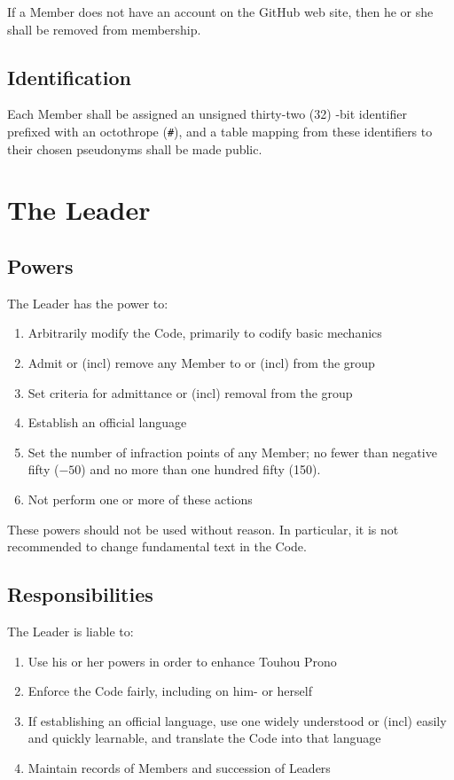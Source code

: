 \documentclass[10pt]{book}
\begin{document}
If a Member does not have an account on the GitHub web site, then he or she shall be removed from membership.

\subsection{Identification}

Each Member shall be assigned an unsigned thirty-two (32) -bit identifier prefixed with an octothrope (\texttt{\#}), and a table mapping from these identifiers to their chosen pseudonyms shall be made public.

\section{The Leader}
\label{sec:leader}

\subsection{Powers}

The Leader has the power to:

\begin{enumerate}
 \item Arbitrarily modify the Code, primarily to codify basic mechanics
 \item Admit or (incl) remove any Member to or (incl) from the group
 \item Set criteria for admittance or (incl) removal from the group
 \item Establish an official language
 \item Set the number of infraction points of any Member; no fewer than negative fifty ($-50$) and no more than one hundred fifty (150).
 \item Not perform one or more of these actions
\end{enumerate}

These powers should not be used without reason. In particular, it is not recommended to change fundamental text in the Code.

\subsection{Responsibilities}

The Leader is liable to:

\begin{enumerate}
 \item Use his or her powers in order to enhance Touhou Prono
 \item Enforce the Code fairly, including on him- or herself
 \item If establishing an official language, use one widely understood or (incl) easily and quickly learnable, and translate the Code into that language
 \item Maintain records of Members and succession of Leaders
\end{enumerate}
\end{document}
